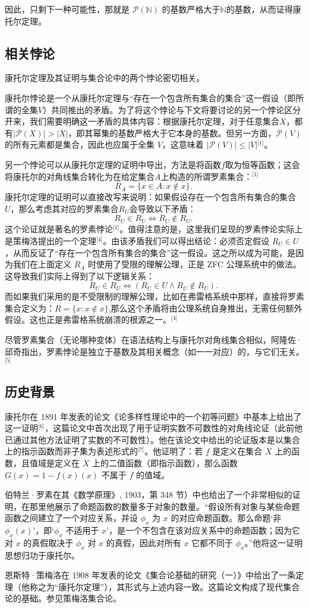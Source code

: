 因此，只剩下一种可能性，那就是 $\mathcal{P}(\mathbb{N})$ 的基数严格大于$\mathbb{N}$的基数，从而证得康托尔定理。
\subsection{相关悖论}
康托尔定理及其证明与集合论中的两个悖论密切相关。

康托尔悖论是一个从康托尔定理与“存在一个包含所有集合的集合”这一假设（即所谓的全集$V$）共同推出的矛盾。为了将这个悖论与下文将要讨论的另一个悖论区分开来，我们需要明确这一矛盾的具体内容：根据康托尔定理，对于任意集合$X$，都有$|\mathcal{P}(X)| > |X|$，即其幂集的基数严格大于它本身的基数。但另一方面，$\mathcal{P}(V)$ 的所有元素都是集合，因此也应属于全集 $V$，这意味着 $|\mathcal{P}(V)| \leq |V|$\(^\text{[1]}\)。

另一个悖论可以从康托尔定理的证明中导出，方法是将函数$f$取为恒等函数；这会将康托尔的对角线集合转化为在给定集合$A$上构造的所谓罗素集合：\(^\text{[1]}\)
$$
R_A = \{ x \in A : x \notin x \}.~
$$
康托尔定理的证明可以直接改写来说明：如果假设存在一个包含所有集合的集合 $U$，那么考虑其对应的罗素集合$R_U$会导致以下矛盾：
$$
R_U \in R_U \iff R_U \notin R_U.~
$$
这个论证就是著名的罗素悖论\(^\text{[1]}\)。值得注意的是，这里我们呈现的罗素悖论实际上是策梅洛提出的一个定理\(^\text{[4]}\)。由该矛盾我们可以得出结论：必须否定假设 $R_U \in U$，从而反证了“存在一个包含所有集合的集合”这一假设。这之所以成为可能，是因为我们在上面定义 $R_A$ 时使用了受限的理解公理，正是 ZFC 公理系统中的做法。这导致我们实际上得到了以下逻辑关系：
$$
R_U \in R_U \iff (R_U \in U \land R_U \notin R_U).~
$$
而如果我们采用的是不受限制的理解公理，比如在弗雷格系统中那样，直接将罗素集合定义为：$R = \{ x : x \notin x \}$,那么这个矛盾将由公理系统自身推出，无需任何额外假设。这也正是弗雷格系统崩溃的根源之一。\(^\text{[4]}\)

尽管罗素集合（无论哪种变体）在语法结构上与康托尔对角线集合相似，阿隆佐·邱奇指出，罗素悖论是独立于基数及其相关概念（如一一对应）的，与它们无关。\(^\text{[5]}\)
\subsection{历史背景}
康托尔在 1891 年发表的论文《论多样性理论中的一个初等问题》中基本上给出了这一证明\(^\text{[6]}\)，这篇论文中首次出现了用于证明实数不可数性的对角线论证（此前他已通过其他方法证明了实数的不可数性）。他在该论文中给出的论证版本是以集合上的指示函数而非子集为表述形式的\(^\text{[7]}\)。他证明了：若 $f$ 是定义在集合 $X$ 上的函数，且值域是定义在 $X$ 上的二值函数（即指示函数），那么函数 $G(x) = 1 - f(x)(x)$ 不属于 $f$ 的值域。

伯特兰·罗素在其《数学原理》, 1903，第 348 节）中也给出了一个非常相似的证明，在那里他展示了命题函数的数量多于对象的数量。“假设所有对象与某些命题函数之间建立了一个对应关系，并设 $\phi_x$ 为 $x$ 的对应命题函数。那么命题‘非 $\phi_x(x)$’，即‘$\phi_x$ 不适用于 $x$’，是一个不包含在该对应关系中的命题函数；因为它对 $x$ 的真假取决于 $\phi_x$ 对 $x$ 的真假，因此对所有 $x$ 它都不同于 $\phi_x$。”他将这一证明思想归功于康托尔。

恩斯特·策梅洛在 1908 年发表的论文《集合论基础的研究（一）》中给出了一条定理（他称之为“康托尔定理”），其形式与上述内容一致。这篇论文构成了现代集合论的基础。参见策梅洛集合论。

